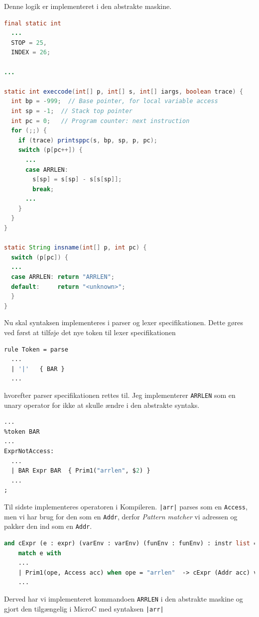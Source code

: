 \documentclass[danish,a4paper]{report}
\begin{document}
Denne logik er implementeret i den abstrakte maskine.

\begin{lstlisting}[language=java]
final static int 
  ...
  STOP = 25,
  INDEX = 26;

...

static int execcode(int[] p, int[] s, int[] iargs, boolean trace) {
  int bp = -999;  // Base pointer, for local variable access 
  int sp = -1;  // Stack top pointer
  int pc = 0;   // Program counter: next instruction
  for (;;) {
    if (trace) printsppc(s, bp, sp, p, pc);
    switch (p[pc++]) {
      ...
      case ARRLEN:
        s[sp] = s[sp] - s[s[sp]];
        break;
      ...
    }
  }
}

static String insname(int[] p, int pc) {
  switch (p[pc]) {
  ...
  case ARRLEN: return "ARRLEN";
  default:     return "<unknown>";
  }
}
\end{lstlisting}

Nu skal syntaksen implementeres i parser og lexer specifikationen. Dette gøres ved først at tilføje det nye token til lexer specifikationen

\begin{lstlisting}[language=ML]
rule Token = parse
  ...
  | '|'   { BAR }
  ...
\end{lstlisting}

hvorefter parser specifikationen rettes til. Jeg implementerer \texttt{ARRLEN} som en unary operator for ikke at skulle ændre i den abstrakte syntaks.

\begin{lstlisting}[language=ML]
...
%token BAR
...
ExprNotAccess:
  ...
  | BAR Expr BAR  { Prim1("arrlen", $2) }
  ...
;
\end{lstlisting}

Til sidste implementeres operatoren i Kompileren. \texttt{|arr|} parses som en \texttt{Access}, men vi har brug for den som en \texttt{Addr}, derfor \textit{Pattern matcher} vi adressen og pakker den ind som en \texttt{Addr}.

\begin{lstlisting}[language=ML]
and cExpr (e : expr) (varEnv : varEnv) (funEnv : funEnv) : instr list = 
    match e with
    ...
    | Prim1(ope, Access acc) when ope = "arrlen"  -> cExpr (Addr acc) varEnv funEnv @ [ARRLEN]
    ...
\end{lstlisting}

Derved har vi implementeret kommandoen \texttt{ARRLEN} i den abstrakte maskine og gjort den tilgængelig i MicroC med syntaksen \texttt{|arr|}
\end{document}
